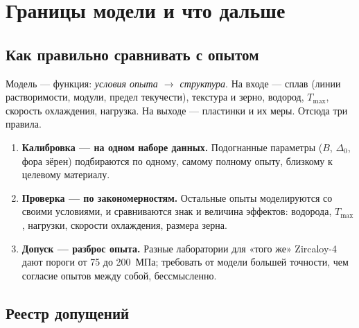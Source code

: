 \chapter{Границы модели и что дальше}\label{ch:limits}

\section{Как правильно сравнивать с опытом}

Модель --- функция: \emph{условия опыта $\to$ структура}. На входе --- сплав (линии
растворимости, модули, предел текучести), текстура и зерно, водород, $T_{\max}$, скорость
охлаждения, нагрузка. На выходе --- пластинки и их меры. Отсюда три правила.
\begin{enumerate}
\item \textbf{Калибровка --- на одном наборе данных.} Подогнанные параметры ($B$, $\Delta_0$, фора
  зёрен) подбираются по одному, самому полному опыту, близкому к целевому материалу.
\item \textbf{Проверка --- по закономерностям.} Остальные опыты моделируются со своими условиями,
  и сравниваются знак и величина эффектов: водорода, $T_{\max}$, нагрузки, скорости охлаждения,
  размера зерна.
\item \textbf{Допуск --- разброс опыта.} Разные лаборатории для «того же» Zircaloy-4 дают пороги от
  75 до 200~МПа; требовать от модели большей точности, чем согласие опытов между собой,
  бессмысленно.
\end{enumerate}


\section{Реестр допущений}

